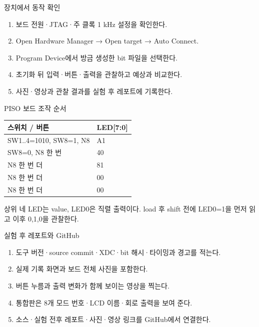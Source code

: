 \begin{frame}{장치에서 동작 확인}
\small
\begin{enumerate}
\item 보드 전원·JTAG·주 클록 1 kHz 설정을 확인한다.
\item Open Hardware Manager → Open target → Auto Connect.
\item Program Device에서 방금 생성한 bit 파일을 선택한다.
\item 초기화 뒤 입력·버튼·출력을 관찰하고 예상과 비교한다.
\item 사진·영상과 관찰 결과를 실험 후 레포트에 기록한다.
\end{enumerate}
\end{frame}

\begin{frame}{PISO 보드 조작 순서}
\small
\begin{center}\renewcommand{\arraystretch}{1.55}\begin{tabular}{ll}
스위치 / 버튼 & LED[7:0]\\\hline
SW1..4=1010, SW8=1, N8 & A1\\
SW8=0, N8 한 번 & 40\\
N8 한 번 더 & 81\\
N8 한 번 더 & 00\\
N8 한 번 더 & 00\\
\end{tabular}\end{center}상위 네 LED는 value, LED0은 직렬 출력이다. load 후 shift 전에 LED0=1을 먼저 읽고 이후 0,1,0을 관찰한다.\par
\end{frame}

\begin{frame}{실험 후 레포트와 GitHub}
\small
\begin{enumerate}
\item 도구 버전·source commit·XDC·bit 해시·타이밍과 경고를 적는다.
\item 실제 기록 화면과 보드 전체 사진을 포함한다.
\item 버튼 누름과 출력 변화가 함께 보이는 영상을 찍는다.
\item 통합판은 8개 모드 번호·LCD 이름·회로 출력을 보여 준다.
\item 소스·실험 전후 레포트·사진·영상 링크를 GitHub에서 연결한다.
\end{enumerate}
\end{frame}

